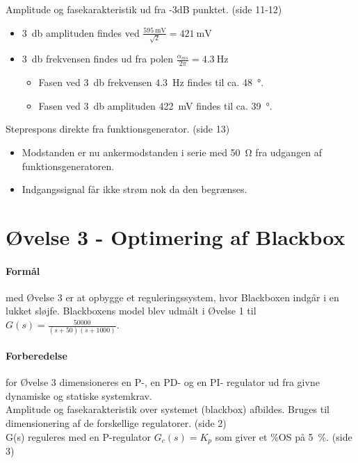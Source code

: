 \documentclass[danish]{article}
\begin{document}
Amplitude og fasekarakteristik ud fra -3dB punktet. (side 11-12)
\begin{itemize}
	\item \SI{3}{\decibel} amplituden findes ved $\frac{\SI{595}{\milli\volt}}{\sqrt{2}} = \SI{421}{\milli\volt}$
	\item \SI{3}{\decibel} frekvensen findes ud fra polen $\frac{\alpha_{ms}}{2\pi} = \SI{4,3}{\hertz}$
	\begin{itemize}
		\item Fasen ved \SI{3}{\decibel} frekvensen \SI{4,3}{\hertz}  findes til ca. \SI{48}{\degree}. 
		\item Fasen ved \SI{3}{\decibel} amplituden \SI{422}{\milli\volt} findes til ca. \SI{39}{\degree}.
	\end{itemize}
\end{itemize}

Steprespons direkte fra funktionsgenerator. (side 13)
\begin{itemize}
	\item Modstanden er nu ankermodstanden i serie med \SI{50}{\ohm} fra udgangen af funktionsgeneratoren. 
	\item Indgangssignal får ikke strøm nok da den begrænses.
\end{itemize}
\newpage
\section{Øvelse 3 - Optimering af Blackbox}
\paragraph{Formål} med Øvelse 3 er at opbygge et reguleringssystem, hvor Blackboxen indgår i en lukket sløjfe. Blackboxens model blev udmålt i Øvelse 1 til $G(s)=\frac{50000}{(s+50)(s+1000)}$. 

\paragraph{Forberedelse} for Øvelse 3 dimensioneres en P-, en PD- og en PI- regulator ud fra givne dynamiske og statiske systemkrav.\\
\newline Amplitude og fasekarakteristik over systemet (blackbox) afbildes. Bruges til dimensionering af de forskellige regulatorer. (side 2)\\

G(s) reguleres med en P-regulator $G_c(s) = K_p$ som giver et $\si{\percent}$OS på \SI{5}{\percent}. (side 3) 
\end{document}
